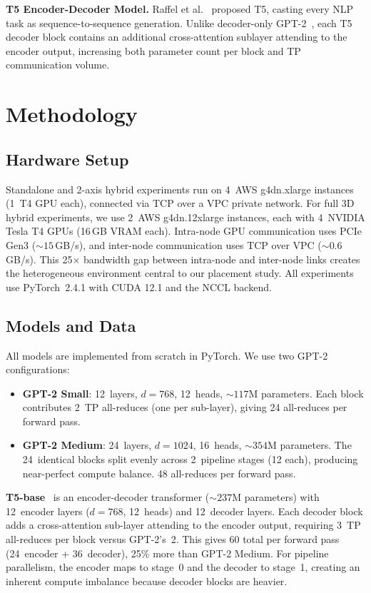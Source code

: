 \documentclass[conference]{IEEEtran}
\begin{document}
\textbf{T5 Encoder-Decoder Model.} Raffel et al.~\cite{raffel2020exploring} proposed T5, casting every NLP task as sequence-to-sequence generation. Unlike decoder-only GPT-2~\cite{radford2019language}, each T5 decoder block contains an additional cross-attention sublayer attending to the encoder output, increasing both parameter count per block and TP communication volume.

\section{Methodology}

\subsection{Hardware Setup}

Standalone and 2-axis hybrid experiments run on 4~AWS g4dn.xlarge instances (1~T4 GPU each), connected via TCP over a VPC private network. For full 3D hybrid experiments, we use 2~AWS g4dn.12xlarge instances, each with 4~NVIDIA Tesla T4 GPUs (16\,GB VRAM each). Intra-node GPU communication uses PCIe Gen3 (${\sim}15$\,GB/s), and inter-node communication uses TCP over VPC (${\sim}0.6$\,GB/s). This 25$\times$ bandwidth gap between intra-node and inter-node links creates the heterogeneous environment central to our placement study. All experiments use PyTorch~2.4.1 with CUDA 12.1 and the NCCL backend.

\subsection{Models and Data}

All models are implemented from scratch in PyTorch. We use two GPT-2~\cite{radford2019language} configurations:
\begin{itemize}
\item \textbf{GPT-2 Small}: 12~layers, $d{=}768$, 12~heads, ${\sim}117$M parameters. Each block contributes 2~TP all-reduces (one per sub-layer), giving 24 all-reduces per forward pass.
\item \textbf{GPT-2 Medium}: 24~layers, $d{=}1024$, 16~heads, ${\sim}354$M parameters. The 24~identical blocks split evenly across 2~pipeline stages (12 each), producing near-perfect compute balance. 48 all-reduces per forward pass.
\end{itemize}

\textbf{T5-base}~\cite{raffel2020exploring} is an encoder-decoder transformer (${\sim}237$M parameters) with 12~encoder layers ($d{=}768$, 12~heads) and 12~decoder layers. Each decoder block adds a cross-attention sub-layer attending to the encoder output, requiring 3~TP all-reduces per block versus GPT-2's~2. This gives 60 total per forward pass (24~encoder + 36~decoder), 25\% more than GPT-2 Medium. For pipeline parallelism, the encoder maps to stage~0 and the decoder to stage~1, creating an inherent compute imbalance because decoder blocks are heavier.
\end{document}
